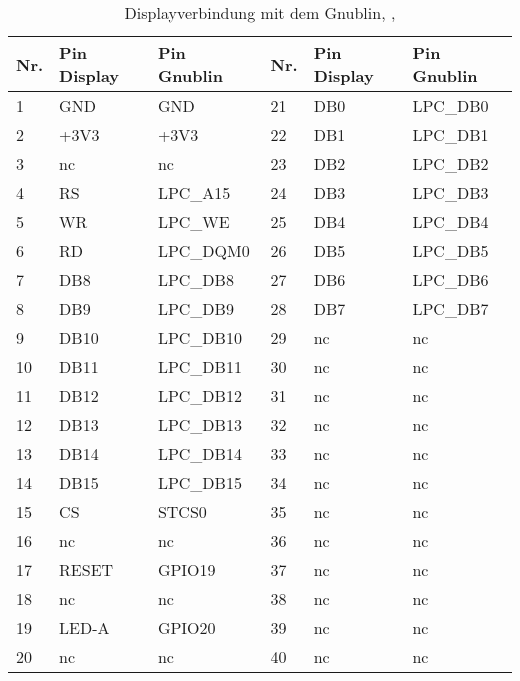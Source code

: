 \begin{table}[h]
\begin{tabular}{|p{0.6cm}|p{2.5cm}|p{2.5cm}|p{0.6cm}|p{2.5cm}|p{2.5cm}|}\hline
\rowcolor{TableBackgroundColor} 
\textbf{Nr.}	&	\textbf{Pin Display}	&	\textbf{Pin Gnublin}  & \textbf{Nr.}	&	\textbf{Pin Display}	&	\textbf{Pin Gnublin} 	\\ \hline
1				&	GND						&	GND					  &	21				&	DB0						&	LPC\_DB0				\\ \hline
2				&	+3V3					&	+3V3				  &	22				&	DB1						&	LPC\_DB1				\\ \hline
3				&	nc						&	nc				 	  & 23				&	DB2						&	LPC\_DB2				\\ \hline
4				&	RS						&	LPC\_A15	    	  &	24				&	DB3						&	LPC\_DB3				\\ \hline
5				&	WR						&	LPC\_WE				  &	25				&	DB4						&	LPC\_DB4				\\ \hline
6				&	RD						&	LPC\_DQM0			  &	26				&	DB5						&	LPC\_DB5				\\ \hline
7				&	DB8						&	LPC\_DB8			  &	27				&	DB6						&	LPC\_DB6				\\ \hline
8				&	DB9						&	LPC\_DB9			  &	28				&	DB7						&	LPC\_DB7				\\ \hline
9				&	DB10					&	LPC\_DB10			  &	29				&	nc						&	nc						\\ \hline
10				&	DB11					&	LPC\_DB11			  &	30				&	nc						&	nc						\\ \hline
11				&	DB12					&	LPC\_DB12			  &	31				&	nc						&	nc						\\ \hline
12				&	DB13					&	LPC\_DB13			  &	32				&	nc						&	nc						\\ \hline
13				&	DB14					&	LPC\_DB14			  &	33				&	nc						&	nc						\\ \hline
14				&	DB15					&	LPC\_DB15			  &	34				&	nc						&	nc						\\ \hline
15				&	CS						&	STCS0				  &	35				&	nc						&	nc						\\ \hline
16				&	nc						&	nc					  &	36				&	nc						&	nc						\\ \hline
17				&	RESET					&	GPIO19				  &	37				&	nc						&	nc						\\ \hline
18				&	nc						&	nc					  &	38				&	nc						&	nc						\\ \hline
19				&	LED-A					&	GPIO20				  &	39				&	nc						&	nc						\\ \hline
20				&	nc						&	nc				 	  &	40				&	nc						&	nc						\\ \hline

\end{tabular}
\caption{Displayverbindung mit dem Gnublin, \cite{Coldtears2014}, \cite{EmbeddedProjects2013}}
\label{tab:display_gnublin_verbindung}
\end{table}

